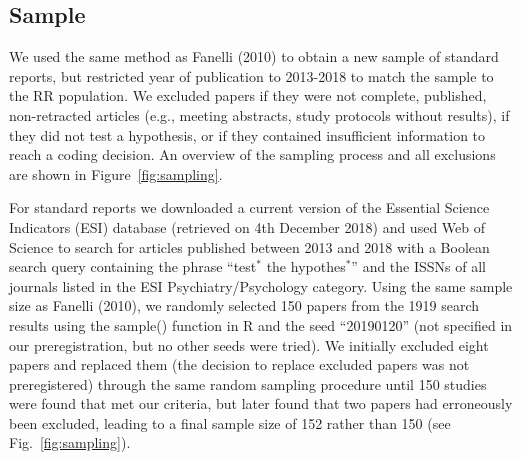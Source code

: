 \documentclass[british,,man,floatsintext]{apa6}
\begin{document}
\hypertarget{sample}{%
\subsection{Sample}\label{sample}}

We used the same method as Fanelli (2010) to obtain a new sample of standard reports, but restricted year of publication to 2013-2018 to match the sample to the RR population.
We excluded papers if they were not complete, published, non-retracted articles (e.g., meeting abstracts, study protocols without results), if they did not test a hypothesis, or if they contained insufficient information to reach a coding decision.
An overview of the sampling process and all exclusions are shown in Figure~\ref{fig:sampling}.

For standard reports we downloaded a current version of the Essential Science Indicators (ESI) database (retrieved on 4th December 2018) and used Web of Science to search for articles published between 2013 and 2018 with a Boolean search query containing the phrase \enquote{test\(^\ast\) the hypothes\(^\ast\)} and the ISSNs of all journals listed in the ESI Psychiatry/Psychology category.
Using the same sample size as Fanelli (2010), we randomly selected 150 papers from the 1919 search results using the sample() function in R and the seed \enquote{20190120} (not specified in our preregistration, but no other seeds were tried).
We initially excluded eight papers and replaced them (the decision to replace excluded papers was not preregistered) through the same random sampling procedure until 150 studies were found that met our criteria, but later found that two papers had erroneously been excluded, leading to a final sample size of 152 rather than 150 (see Fig.~\ref{fig:sampling}).
\end{document}
